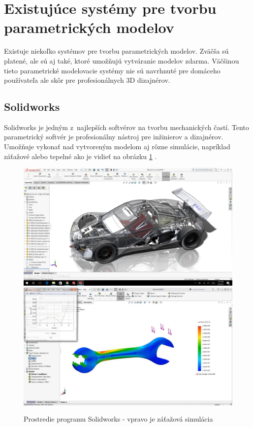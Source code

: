 


\section{Existujúce systémy pre tvorbu parametrických modelov} \label{sec:Existing_systems}
Existuje niekoľko systémov pre tvorbu parametrických modelov. Zväčša sú platené, ale sú aj také, ktoré umožňujú vytváranie modelov zdarma. Väčšinou tieto parametrické modelovacie systémy nie sú navrhnuté pre domáceho používateľa ale skôr pre profesionálnych 3D dizajnérov.


\subsection*{Solidworks}
Solidworks je jedným z~najlepších softvérov na tvorbu mechanických častí. Tento parametrický softvér je profesionálny nástroj pre inžinierov a dizajnérov. Umožňuje vykonať nad vytvoreným modelom aj rôzne simulácie, napríklad záťažové alebo tepelné ako je vidieť na obrázku \ref{fig:solidworks_simulations} \cite{gaget_2018}.\nopagebreak
\begin{figure}[H]
    \centering
    \includegraphics[width = 0.49\linewidth]{obrazky-figures/programs/solidworks_01.png}
    \includegraphics[width = 0.49\linewidth]{obrazky-figures/programs/solidworks, simulation.jpg}
    \caption{Prostredie programu Solidworks - vpravo je záťažová simulácia \protect\footnotemark
    }
    \label{fig:solidworks_simulations}
\end{figure}

